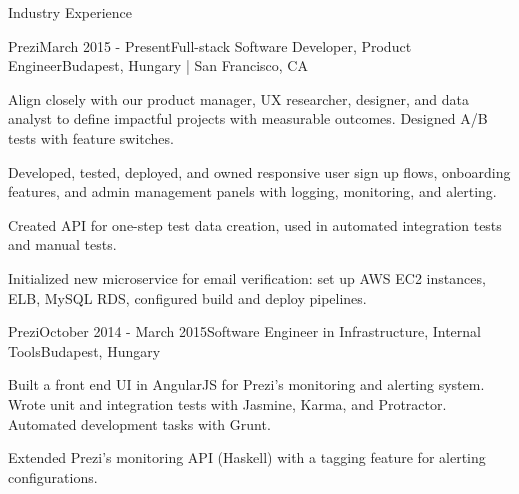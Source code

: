\documentclass{resume} %
\begin{document}
\begin{rSection}{Industry Experience}

\begin{rSubsection}{Prezi}{March 2015 - Present}{Full-stack Software Developer, Product Engineer}{Budapest, Hungary | San Francisco, CA}
\item Align closely with our product manager, UX researcher, designer, and data analyst to define impactful projects with measurable outcomes. Designed A/B tests with feature switches.
\item Developed, tested, deployed, and owned responsive user sign up flows, onboarding features, and admin management panels with logging, monitoring, and alerting.


\item Created API for one-step test data creation, used in automated integration tests and manual tests.
\item Initialized new microservice for email verification: set up AWS EC2 instances, ELB, MySQL RDS, configured build and deploy pipelines.

\end{rSubsection}


\begin{rSubsection}{Prezi}{October 2014 - March 2015}{Software Engineer in Infrastructure, Internal Tools}{Budapest, Hungary}
\item Built a front end UI in AngularJS for Prezi's monitoring and alerting system. Wrote unit and integration tests with Jasmine, Karma, and Protractor. Automated development tasks with Grunt.
\item Extended Prezi's monitoring API (Haskell) with a tagging feature for alerting configurations.
\end{rSubsection}


\end{rSection}
\end{document}
